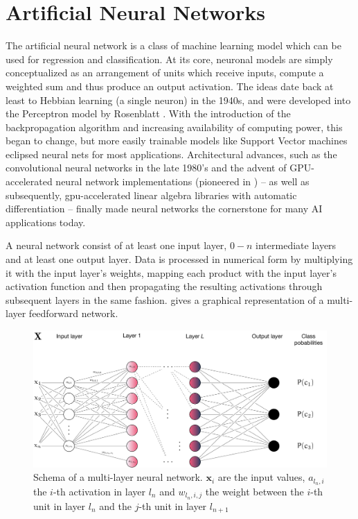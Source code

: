\hypertarget{sec:anns}{%
\section{Artificial Neural Networks}\label{sec:anns}}

The artificial neural network is a class of machine learning model which can be
used for regression and classification.  At its core, neuronal models are simply
conceptualized as an arrangement of units which receive inputs, compute a
weighted sum and thus produce an output activation. The ideas date back at least
to Hebbian learning (a single neuron) in the 1940s, and were developed into the
Perceptron model by Rosenblatt \citep{Rosenblatt58theperceptron}. With the
introduction of the backpropagation algorithm \citep{werbos1975beyond} and
increasing availability of computing power, this began to change, but more
easily trainable models like Support Vector machines eclipsed neural nets for
most applications.  Architectural advances, such as the convolutional neural
networks in the late 1980's \citep{LeCun:1989:BAH:1351079.1351090} and the
advent of GPU-accelerated neural network implementations (pioneered in
\cite{Ciresan11flexible}) -- as well as subsequently, gpu-accelerated linear
algebra libraries with automatic differentiation -- finally made neural networks
the cornerstone for many AI applications today.

A neural network consist of at least one input layer, \(0-n\)
intermediate layers and at least one output layer. Data is processed in
numerical form by multiplying it with the input layer's weights, mapping
each product with the input layer's activation function and then
propagating the resulting activations through subsequent layers in the
same fashion.  gives a graphical representation of a
multi-layer feedforward network.

\begin{figure}
    \hypertarget{fig:neuralnet}{%
        \centering
        \includegraphics[max width=\textwidth]{gfx/diagrams/neural_network/neural_net.pdf}
        \caption[Schema of a multi-layer neural network]{Schema of a multi-layer neural network. \(\mathbf{x}_i\) are
            the input values, \(a_{l_n,i}\) the \(i\)-th activation in layer \(l_n\)
            and \(w_{l_n,i,j}\) the weight between the \(i\)-th unit in layer
        \(l_n\) and the \(j\)-th unit in layer \(l_{n+1}\)}\label{fig:neuralnet}
    }
\end{figure}

